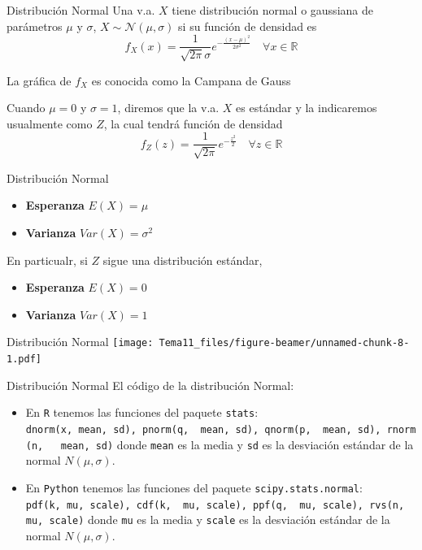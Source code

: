 \documentclass[
  ignorenonframetext,
]{beamer}
\providecommand{\tightlist}{%
  \setlength{\itemsep}{0pt}\setlength{\parskip}{0pt}}
\begin{document}
\begin{frame}{Distribución Normal}
\protect\hypertarget{distribuciuxf3n-normal}{}
Una v.a. \(X\) tiene distribución normal o gaussiana de parámetros
\(\mu\) y \(\sigma\), \(X\sim\mathcal{N}(\mu,\sigma)\) si su función de
densidad es
\[f_X(x)=\frac{1}{\sqrt{2\pi}\sigma}e^{-\frac{(x-\mu)^2}{2\sigma^2}}\quad \forall x\in\mathbb{R}\]

La gráfica de \(f_X\) es conocida como la Campana de Gauss

Cuando \(\mu = 0\) y \(\sigma = 1\), diremos que la v.a. \(X\) es
estándar y la indicaremos usualmente como \(Z\), la cual tendrá función
de densidad
\[f_Z(z)=\frac{1}{\sqrt{2\pi}}e^{-\frac{z^2}{2}}\quad \forall z\in\mathbb{R}\]
\end{frame}

\begin{frame}{Distribución Normal}
\protect\hypertarget{distribuciuxf3n-normal-1}{}
\begin{itemize}
\tightlist
\item
  \textbf{Esperanza} \(E(X) = \mu\)
\item
  \textbf{Varianza} \(Var(X) = \sigma^2\)
\end{itemize}

En particualr, si \(Z\) sigue una distribución estándar,

\begin{itemize}
\tightlist
\item
  \textbf{Esperanza} \(E(X) = 0\)
\item
  \textbf{Varianza} \(Var(X) = 1\)
\end{itemize}
\end{frame}

\begin{frame}{Distribución Normal}
\protect\hypertarget{distribuciuxf3n-normal-2}{}
\texttt{[image: Tema11\_files/figure-beamer/unnamed-chunk-8-1.pdf]}
\end{frame}

\begin{frame}[fragile]{Distribución Normal}
\protect\hypertarget{distribuciuxf3n-normal-3}{}
El código de la distribución Normal:

\begin{itemize}
\tightlist
\item
  En \texttt{R} tenemos las funciones del paquete \texttt{stats}:
  \texttt{dnorm(x,\ mean,\ sd),\ pnorm(q,\ \ mean,\ sd),\ qnorm(p,\ \ mean,\ sd),\ rnorm(n,\ \ \ mean,\ sd)}
  donde \texttt{mean} es la media y \texttt{sd} es la desviación
  estándar de la normal \(N(\mu, \sigma)\).
\item
  En \texttt{Python} tenemos las funciones del paquete
  \texttt{scipy.stats.normal}:
  \texttt{pdf(k,\ mu,\ scale),\ cdf(k,\ \ mu,\ scale),\ ppf(q,\ \ mu,\ scale),\ rvs(n,\ \ mu,\ scale)}
  donde \texttt{mu} es la media y \texttt{scale} es la desviación
  estándar de la normal \(N(\mu, \sigma)\).
\end{itemize}
\end{frame}
\end{document}
